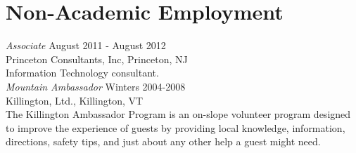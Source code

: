 \documentclass{article}
\begin{document}
  \section*{Non-Academic Employment}             
  \textsl{Associate} \hfill August 2011 - August 2012\\
  Princeton Consultants, Inc, Princeton, NJ\\
  Information Technology consultant.\\

  \noindent\textsl{Mountain Ambassador} \hfill Winters 2004-2008\\
  Killington, Ltd., Killington, VT \\
  The Killington Ambassador Program is an on-slope volunteer program
  designed to improve the experience of guests by providing local knowledge, 
  information, directions, safety tips, and just about any other help a guest might need.

\end{document}
